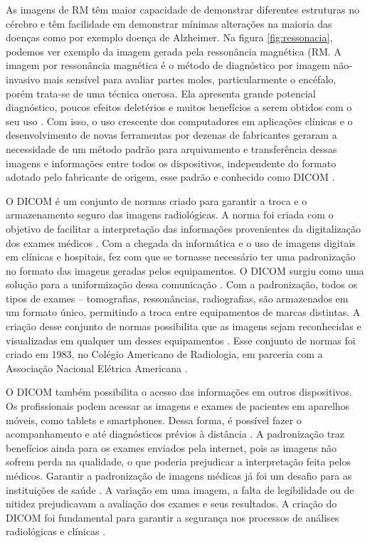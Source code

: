 \documentclass[openright]{UFRGS} %
\begin{document}
As imagens de RM têm maior capacidade de demonstrar diferentes estruturas no cérebro e têm facilidade em demonstrar mínimas alterações na maioria das doenças como por exemplo doença de Alzheimer. Na figura \ref{fig:ressonacia}, podemos ver exemplo da imagem gerada pela ressonância magnética (RM. A imagem por ressonância magnética é o método de diagnóstico por imagem não-invasivo mais sensível para avaliar partes moles, particularmente o encéfalo, porém trata-se de uma técnica onerosa. Ela apresenta grande potencial diagnóstico, poucos efeitos deletérios e muitos benefícios a serem obtidos com o seu uso \cite{mazzola2009ressonancia}. Com isso, o uso crescente dos computadores em aplicações clínicas e o desenvolvimento de novas ferramentas por dezenas de fabricantes geraram a necessidade de um método padrão para arquivamento e transferência dessas imagens e informações entre todos os dispositivos, independente do formato adotado pelo fabricante de origem, esse padrão e conhecido como DICOM \cite{grauer2009working}.


O DICOM é um conjunto de normas criado para garantir a troca e o armazenamento seguro das imagens radiológicas. A norma foi criada com o objetivo de facilitar a interpretação das informações provenientes da digitalização dos exames médicos \cite{graham2005dicom}. Com a chegada da informática e o uso de imagens digitais em clínicas e hospitais, fez com que se tornasse necessário ter uma padronização no formato das imagens geradas pelos equipamentos. O DICOM surgiu como uma solução para a uniformização dessa comunicação \cite{mustra2008overview}. Com a padronização, todos os tipos de exames – tomografias, ressonâncias, radiografias, são armazenados em um formato único, permitindo a troca entre equipamentos de marcas distintas. A criação desse conjunto de normas possibilita que as imagens sejam reconhecidas e visualizadas em qualquer um desses equipamentos \cite{graham2005dicom}. Esse conjunto de normas foi criado em 1983, no Colégio Americano de Radiologia, em parceria com a Associação Nacional Elétrica Americana \cite{varma2012managing}.

O DICOM também possibilita o acesso das informações em outros dispositivos. Os profissionais podem acessar as imagens e exames de pacientes em aparelhos móveis, como tablets e smartphones. Dessa forma, é possível fazer o acompanhamento e até diagnósticos prévios à distância \cite{noumeir2006benefits}. A padronização traz benefícios ainda para os exames enviados pela internet, pois as imagens não sofrem perda na qualidade, o que poderia prejudicar a interpretação feita pelos médicos. Garantir a padronização de imagens médicas já foi um desafio para as instituições de saúde \cite{noumeir2006benefits}. A variação em uma imagem, a falta de legibilidade ou de nitidez prejudicavam a avaliação dos exames e seus resultados. A criação do DICOM foi fundamental para garantir a segurança nos processos de análises radiológicas e clínicas \cite{liu2007medical}.
\end{document}
